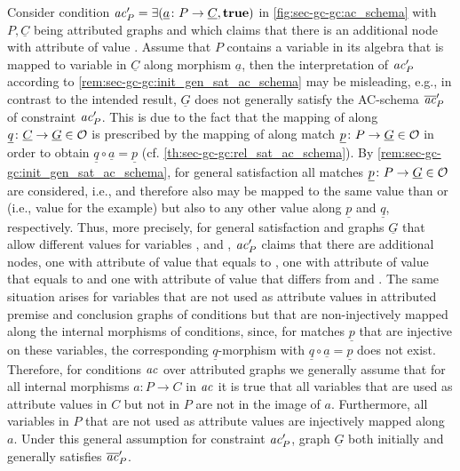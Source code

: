 \begin{remark}
\label{rem:sec-gc-gc:data_cond}
Consider condition $\mathit{ac}'_P=\exists(\underline{a}\colon P \to \underline{C},\textbf{true})$ in \cref{fig:sec-gc-gc:ac_schema} with $P,\underline{C}$ being attributed graphs and which claims that there is an additional  node with attribute  of value .
Assume that $P$ contains a variable  in its algebra that is mapped to variable  in $\underline{C}$ along morphism $\underline{a}$, then the interpretation of $\mathit{ac}'_P$ according to \cref{rem:sec-gc-gc:init_gen_sat_ac_schema} may be misleading, e.g., in contrast to the intended result, $\underline{G}$ does not generally satisfy the AC-schema $\overline{\mathit{ac}}'_P$ of constraint $\mathit{ac}'_P$.
This is due to the fact that the mapping of  along $\underline{q}\colon \underline{C} \to \underline{G} \in {\cal O}$ is prescribed by the mapping of  along match $\underline{p}\colon P \to \underline{G} \in {\cal O}$ in order to obtain $\underline{q} \circ \underline{a}=\underline{p}$ (cf. \cref{th:sec-gc-gc:rel_sat_ac_schema}).
By \cref{rem:sec-gc-gc:init_gen_sat_ac_schema}, for general satisfaction all matches $\underline{p}\colon P \to \underline{G} \in {\cal O}$ are considered, i.e.,  and therefore also  may be mapped to the same value than  or  (i.e., value  for the example) but also to any other value along $\underline{p}$ and $\underline{q}$, respectively.
Thus, more precisely, for general satisfaction and graphs $\underline{G}$ that allow different values for variables ,  and , $\mathit{ac}'_P$ claims that there are additional  nodes, one with attribute  of value  that equals to , one with attribute  of value  that equals to  and one with attribute  of value  that differs from  and .
The same situation arises for variables that are not used as attribute values in attributed premise and conclusion graphs of conditions but that are non-injectively mapped along the internal morphisms of conditions, since, for matches $\underline{p}$ that are injective on these variables, the corresponding $\underline{q}$-morphism with $\underline{q} \circ \underline{a}=\underline{p}$ does not exist. 
Therefore, for conditions $\mathit{ac}$ over attributed graphs we generally assume that for all internal morphisms $a\colon P \to C$ in $\mathit{ac}$ it is true that all variables that are used as attribute values in $C$ but not in $P$ are not in the image of $a$.
Furthermore, all variables in $P$ that are not used as attribute values are injectively mapped along $a$.
Under this general assumption for constraint $\mathit{ac}'_P$, graph $\underline{G}$ both initially and generally satisfies $\overline{\mathit{ac}}'_P$.
\envEndMarker
\end{remark}

